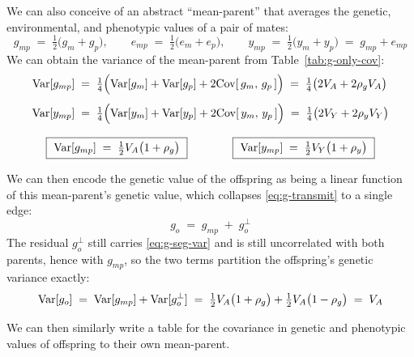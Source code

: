 \documentclass[12pt]{article}
\begin{document}
We can also conceive of an abstract ``mean-parent'' that averages the genetic, environmental, and phenotypic values of a pair of mates:
\begin{equation}\label{eq:mean-parent}
    g_{mp} \;=\; \tfrac12\big(g_m + g_p\big), \qquad
    e_{mp} \;=\; \tfrac12\big(e_m + e_p\big), \qquad
    y_{mp} \;=\; \tfrac12\big(y_m + y_p\big) \;=\; g_{mp} + e_{mp}
\end{equation}
We can obtain the variance of the mean-parent from Table~\ref{tab:g-only-cov}:
\begin{equation}\label{eq:mean-parent-var}
\begin{gathered}
\begin{aligned}
    \mathrm{Var}[g_{mp}] \;&=\; \tfrac14\Big(\mathrm{Var}[g_m] + \mathrm{Var}[g_p] + 2\mathrm{Cov}[\,g_m,\, g_p\,]\Big)
    \;=\; \tfrac14\big(2V_A + 2\rho_g V_A\big) \\[4pt]
    \mathrm{Var}[y_{mp}] \;&=\; \tfrac14\Big(\mathrm{Var}[y_m] + \mathrm{Var}[y_p] + 2\mathrm{Cov}[\,y_m,\, y_p\,]\Big)
    \;=\; \tfrac14\big(2V_Y + 2\rho_y V_Y\big)
\end{aligned} \\[8pt]
    \boxed{\ \mathrm{Var}[g_{mp}] \;=\; \tfrac12 V_A\big(1+\rho_g\big)\ } \qquad\qquad
    \boxed{\ \mathrm{Var}[y_{mp}] \;=\; \tfrac12 V_Y\big(1+\rho_y\big)\ }
\end{gathered}
\end{equation}

We can then encode the genetic value of the offspring as being a linear function of this mean-parent's genetic value, which collapses \eqref{eq:g-transmit} to a single edge:
\begin{equation}\label{eq:g-transmit-mp}
    \boxed{\ g_o \;=\; g_{mp} \;+\; g^{\perp}_o \ }
\end{equation}
The residual $g^{\perp}_o$ still carries \eqref{eq:g-seg-var} and is still uncorrelated with both parents, hence with $g_{mp}$, so the two terms partition the offspring's genetic variance exactly:
\begin{equation}\label{eq:g-partition}
    \mathrm{Var}[g_o] \;=\; \mathrm{Var}[g_{mp}] + \mathrm{Var}[g^{\perp}_o]
    \;=\; \tfrac12 V_A\big(1+\rho_g\big) + \tfrac12 V_A\big(1-\rho_g\big) \;=\; V_A
\end{equation}

We can then similarly write a table for the covariance in genetic and phenotypic values of offspring to their own mean-parent.
\end{document}
